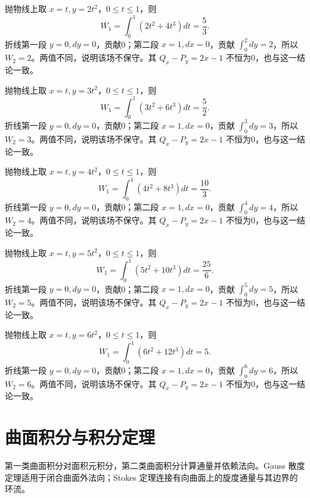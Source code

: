\documentclass[12pt,fontset=fandol]{ctexart}
\begin{document}
\begin{solve}\label{ans:c42q20}
抛物线上取 $x=t,y=2t^2$，$0\le t\le1$，则
\[
W_1=\int_0^1(2t^2+4t^3)dt=\frac{5}{3}.
\]
折线第一段 $y=0,dy=0$，贡献0；第二段 $x=1,dx=0$，贡献 $\int_0^{2}dy=2$，所以 $W_2=2$。两值不同，说明该场不保守。其 $Q_x-P_y=2x-1$ 不恒为0，也与这一结论一致。
\end{solve}

\begin{solve}\label{ans:c42q21}
抛物线上取 $x=t,y=3t^2$，$0\le t\le1$，则
\[
W_1=\int_0^1(3t^2+6t^3)dt=\frac{5}{2}.
\]
折线第一段 $y=0,dy=0$，贡献0；第二段 $x=1,dx=0$，贡献 $\int_0^{3}dy=3$，所以 $W_2=3$。两值不同，说明该场不保守。其 $Q_x-P_y=2x-1$ 不恒为0，也与这一结论一致。
\end{solve}

\begin{solve}\label{ans:c42q22}
抛物线上取 $x=t,y=4t^2$，$0\le t\le1$，则
\[
W_1=\int_0^1(4t^2+8t^3)dt=\frac{10}{3}.
\]
折线第一段 $y=0,dy=0$，贡献0；第二段 $x=1,dx=0$，贡献 $\int_0^{4}dy=4$，所以 $W_2=4$。两值不同，说明该场不保守。其 $Q_x-P_y=2x-1$ 不恒为0，也与这一结论一致。
\end{solve}

\begin{solve}\label{ans:c42q23}
抛物线上取 $x=t,y=5t^2$，$0\le t\le1$，则
\[
W_1=\int_0^1(5t^2+10t^3)dt=\frac{25}{6}.
\]
折线第一段 $y=0,dy=0$，贡献0；第二段 $x=1,dx=0$，贡献 $\int_0^{5}dy=5$，所以 $W_2=5$。两值不同，说明该场不保守。其 $Q_x-P_y=2x-1$ 不恒为0，也与这一结论一致。
\end{solve}

\begin{solve}\label{ans:c42q24}
抛物线上取 $x=t,y=6t^2$，$0\le t\le1$，则
\[
W_1=\int_0^1(6t^2+12t^3)dt=5.
\]
折线第一段 $y=0,dy=0$，贡献0；第二段 $x=1,dx=0$，贡献 $\int_0^{6}dy=6$，所以 $W_2=6$。两值不同，说明该场不保守。其 $Q_x-P_y=2x-1$ 不恒为0，也与这一结论一致。
\end{solve}

\clearpage
\section{曲面积分与积分定理}\label{sec:ch43}
第一类曲面积分对面积元积分，第二类曲面积分计算通量并依赖法向。Gauss 散度定理适用于闭合曲面外法向；Stokes 定理连接有向曲面上的旋度通量与其边界的环流。
\end{document}
